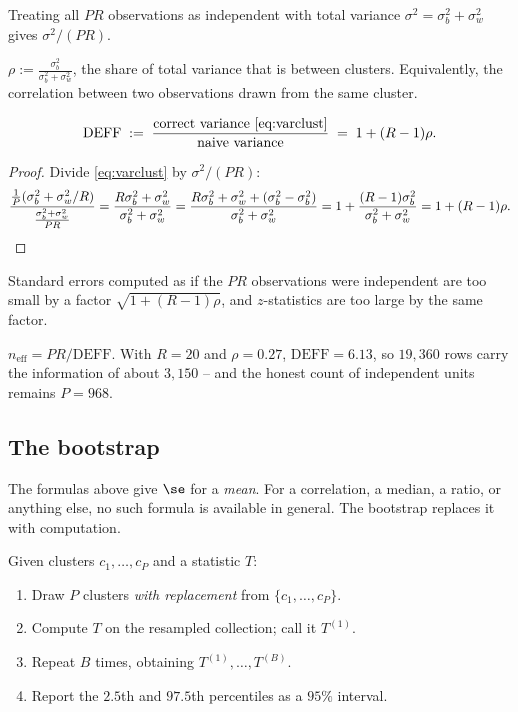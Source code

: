  Treating all $PR$
observations as independent with total variance
$\sigma^2 = \sigma_b^2+\sigma_w^2$ gives $\sigma^2/(PR)$.

\begin{definition}
$\displaystyle \rho := \frac{\sigma_b^2}{\sigma_b^2+\sigma_w^2}$, the share of
total variance that is between clusters. Equivalently, the correlation between
two observations drawn from the same cluster.
\end{definition}

\begin{theorem}
\label{thm:deff}
\[
\mathrm{DEFF}
\;:=\;
\frac{\text{correct variance }\cref{eq:varclust}}{\text{naive variance}}
\;=\; 1+(R-1)\rho .
\]
\end{theorem}
\begin{proof}
Divide \cref{eq:varclust} by $\sigma^2/(PR)$:
\[
\frac{\frac{1}{P}(\sigma_b^2+\sigma_w^2/R)}{\frac{\sigma_b^2+\sigma_w^2}{PR}}
= \frac{R\sigma_b^2+\sigma_w^2}{\sigma_b^2+\sigma_w^2}
= \frac{R\sigma_b^2+\sigma_w^2 + (\sigma_b^2-\sigma_b^2)}{\sigma_b^2+\sigma_w^2}
= 1 + \frac{(R-1)\sigma_b^2}{\sigma_b^2+\sigma_w^2}
= 1+(R-1)\rho. \qedhere
\]
\end{proof}

\begin{corollary}
Standard errors computed as if the $PR$ observations were independent are too
small by a factor $\sqrt{1+(R-1)\rho}$, and $z$-statistics are too large by the
same factor.
\end{corollary}

\begin{remark}
$n_{\mathrm{eff}} = PR/\mathrm{DEFF}$. With $R=20$ and $\rho = 0.27$,
$\mathrm{DEFF}=6.13$, so $19{,}360$ rows carry the information of about
$3{,}150$ -- and the honest count of independent units remains $P = 968$.
\end{remark}

\subsection{The bootstrap}
\label{sec:boot}

The formulas above give $\se$ for a \emph{mean}. For a correlation, a median, a
ratio, or anything else, no such formula is available in general. The bootstrap
replaces it with computation.

\begin{protocol}
\label{prot:boot}
Given clusters $c_1,\dots,c_P$ and a statistic $T$:
\begin{enumerate}
\item Draw $P$ clusters \emph{with replacement} from $\{c_1,\dots,c_P\}$.
\item Compute $T$ on the resampled collection; call it $T^{(1)}$.
\item Repeat $B$ times, obtaining $T^{(1)},\dots,T^{(B)}$.
\item Report the $2.5$th and $97.5$th percentiles as a $95\%$ interval.
\end{enumerate}
\end{protocol}

